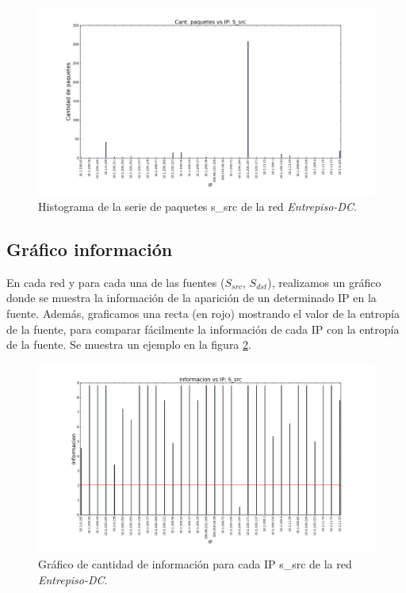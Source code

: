   \begin{figure}[H]
  \begin{center}
    \includegraphics[width=0.8\linewidth]{../imgs/red-entrepiso-dc_S_src_hist.png}
    \caption{Histograma de la serie de paquetes s\_src de la red \emph{Entrepiso-DC}.}
    \label{fig:histograma-entrepiso-dc-s-src-ejemplo}
  \end{center}
  \end{figure}
  
\subsection{Gráfico información}

  En cada red y para cada una de las fuentes ($S_{src}$, $S_{dst}$), realizamos un gráfico donde se muestra la información de la aparición de un determinado IP en la fuente. Además, graficamos una recta (en rojo) mostrando el valor de la entropía de la fuente, para comparar fácilmente la información de cada IP con la entropía de la fuente. Se muestra un ejemplo en la figura \ref{fig:informacion-entrepiso-dc-s-src-ejemplo}.
  
  \begin{figure}  
  \begin{center}
    \includegraphics[width=0.8\linewidth]{../imgs/red-entrepiso-dc_S_src_info.png}
    \caption{Gráfico de cantidad de información para cada IP s\_src de la red \emph{Entrepiso-DC}.}
    \label{fig:informacion-entrepiso-dc-s-src-ejemplo}
  \end{center}
\end{figure}